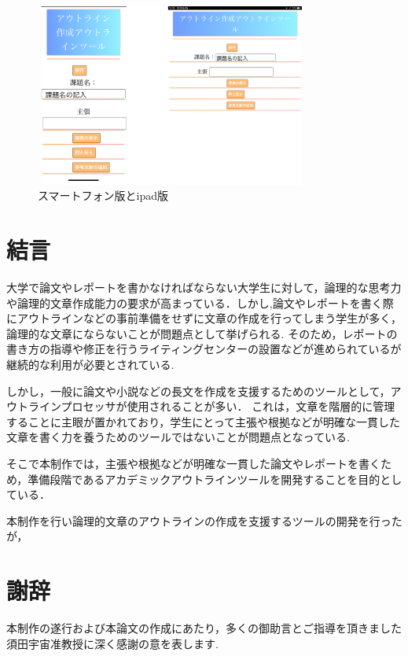\documentclass[a4j,12pt]{jarticle}
\begin{document}
\begin{figure}[h]
\begin{center}
 \includegraphics[clip,width=90mm,height=60mm]{figure/17.png}
\end{center}
 \caption{スマートフォン版とipad版}
 \label{fig:q}
\end{figure}

\newpage
\section*{結言}
大学で論文やレポートを書かなければならない大学生に対して，論理的な思考力や論理的文章作成能力の要求が高まっている．しかし,論文やレポートを書く際にアウトラインなどの事前準備をせずに文章の作成を行ってしまう学生が多く，論理的な文章にならないことが問題点として挙げられる.
そのため，レポートの書き方の指導や修正を行うライティングセンターの設置などが進められているが継続的な利用が必要とされている.

しかし，一般に論文や小説などの長文を作成を支援するためのツールとして，アウトラインプロセッサが使用されることが多い．
これは，文章を階層的に管理することに主眼が置かれており，学生にとって主張や根拠などが明確な一貫した文章を書く力を養うためのツールではないことが問題点となっている.

そこで本制作では，主張や根拠などが明確な一貫した論文やレポートを書くため，準備段階であるアカデミックアウトラインツールを開発することを目的としている．

本制作を行い論理的文章のアウトラインの作成を支援するツールの開発を行ったが，
\section*{謝辞}
本制作の遂行および本論文の作成にあたり，多くの御助言とご指導を頂きました須田宇宙准教授に深く感謝の意を表します.

\end{document}
